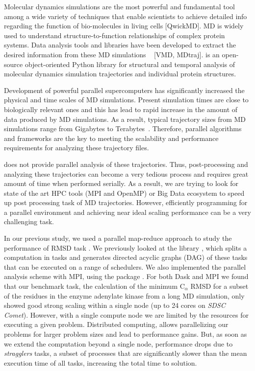 \label{sec:introduction}
Molecular dynamics simulations are the most powerful and fundamental tool among a wide variety of techniques that enable scientists to achieve detailed info regarding the function of bio-molecules in living cells [QwickMD].
MD is widely used to understand structure-to-function relationships of complex protein systems.
Data analysis tools and libraries have been developed to extract the desired information from these MD simulations ~\cite{Gowers:2016aa,Michaud-Agrawal:2011fu,cpptraj-2013,himach-2008} [VMD, MDtraj].
 \citep{Gowers:2016aa,Michaud-Agrawal:2011fu} is an open-source object-oriented Python library for structural and temporal analysis of molecular dynamics simulation trajectories and individual protein structures. 

Development of powerful parallel supercomputers has significantly increased the physical and time scales of MD simulations.
Present simulation times are close to biologically relevant ones and this has lead to rapid increase in the amount of data produced by MD simulations. 
As a result, typical trajectory sizes from MD simulations range from Gigabytes to Terabytes~\cite{Cheatham:2015}. 
Therefore, parallel algorithms and frameworks are the key to meeting the scalability and performance requirements for analyzing these trajectory files. 

 does not provide parallel analysis of these trajectories.
Thus, post-processing and analyzing these trajectories can become a very tedious process and requires great amount of time when performed serially. 
As a result, we are trying to look for state of the art HPC tools (MPI and OpenMP) or Big Data ecosystem to speed up post processing task of MD trajectories.
However, efficiently programming for a parallel environment and achieving near ideal scaling performance can be a very challenging task. 

In our previous study, we used a parallel map-reduce approach to study the performance of RMSD task \cite{Khoshlessan:2017ab, ICCP-2018}. 
We previously looked at the  library \cite{Rocklin:2015aa}, which splits a computation in tasks and generates directed acyclic graphs (DAG) of these tasks that can be executed on a range of schedulers. 
We also implemented the parallel analysis scheme with MPI, using the  package \cite{Dalcin:2011aa, Dalcin:2005aa}. 
For both Dask and MPI we found that our benchmark task, the calculation of the minimum C$_{\alpha}$ RMSD for a
subset of the residues in the enzyme adenylate kinase from a long MD simulation, only showed good strong scaling within a single node (up to 24 cores on \emph{SDSC Comet}).
However, with a single compute node we are limited by the resources for executing a given problem.
Distributed computing, allows parallelizing our problems for larger problem sizes and lead to performance gains.
But, as soon as we extend the computation beyond a single node, performance drops due to \emph{stragglers} tasks, a subset of processes that are significantly slower than the mean execution time of all tasks, increasing the total time to solution.

